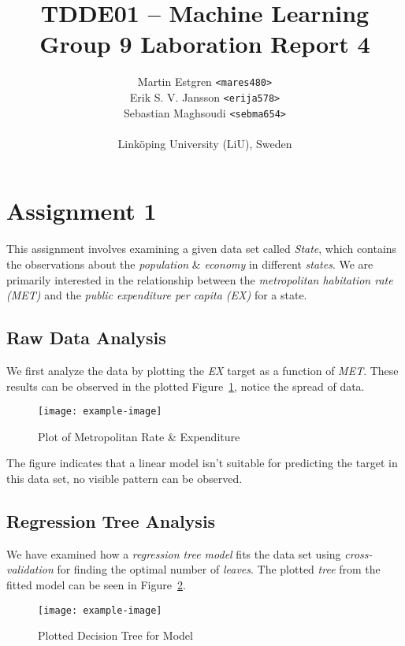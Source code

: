 \documentclass[a4paper, twocolumn]{article}
\title{TDDE01 -- Machine Learning \\
       Group 9 Laboration Report 4}
\author{{Martin Estgren \texttt{<mares480>}} \\
        {Erik S. V. Jansson \texttt{<erija578>}} \\
        {Sebastian Maghsoudi \texttt{<sebma654>}} \\~\\
        {Linköping University (LiU), Sweden}}
\begin{document}
    \maketitle %

    \section*{Assignment 1}

    This assignment involves examining a given data set called \emph{State}, which contains the observations about the \emph{population} \& \emph{economy} in different \emph{states}. We are primarily interested in the relationship between the \emph{metropolitan habitation rate (MET)} and the \emph{public expenditure per capita (EX)} for a state.

    \subsection*{Raw Data Analysis}

    We first analyze the data by plotting the \emph{EX} target as a function of \emph{MET}. These results can be observed in the plotted Figure~\ref{fig:state}, notice the spread of data.

    \begin{figure}[h!]
        \centering
        \caption{Plot of Metropolitan Rate \& Expenditure}
        \label{fig:state}
        \texttt{[image: example-image]}
    \end{figure}

    The figure indicates that a linear model isn't suitable for predicting the target in this data set, no visible pattern can be observed.

    \subsection*{Regression Tree Analysis}

    We have examined how a \emph{regression tree model} fits the data set using \emph{cross-validation} for finding the optimal number of \emph{leaves}. The plotted \emph{tree} from the fitted model can be seen in Figure~\ref{fig:tree}.

    \begin{figure}[h!]
        \centering
        \caption{Plotted Decision Tree for Model}
        \label{fig:tree}
        \texttt{[image: example-image]}
    \end{figure}
\end{document}
